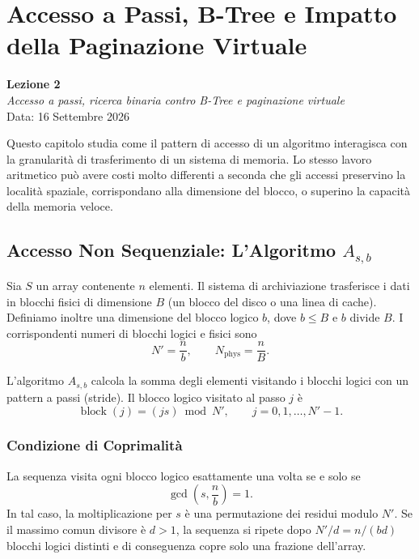 \chapter{Accesso a Passi, B-Tree e Impatto della Paginazione Virtuale}
\label{cha:lecture-two}

\begin{center}
  \textbf{Lezione 2}\\
  \emph{Accesso a passi, ricerca binaria contro B-Tree e paginazione virtuale}\\[0.5em]
  Data: 16 Settembre 2026
\end{center}

Questo capitolo studia come il pattern di accesso di un algoritmo interagisca con la granularità di trasferimento di un sistema di memoria. Lo stesso lavoro aritmetico può avere costi molto differenti a seconda che gli accessi preservino la località spaziale, corrispondano alla dimensione del blocco, o superino la capacità della memoria veloce.

\section{Accesso Non Sequenziale: L'Algoritmo \texorpdfstring{$A_{s,b}$}{A-s-b}}
\label{sec:strided-access}

Sia $S$ un array contenente $n$ elementi. Il sistema di archiviazione trasferisce i dati in blocchi fisici di dimensione $B$ (un blocco del disco o una linea di cache). Definiamo inoltre una dimensione del blocco logico $b$, dove $b \leq B$ e $b$ divide $B$. I corrispondenti numeri di blocchi logici e fisici sono
\[
  N' = \frac{n}{b},
  \qquad
  N_{\mathrm{phys}} = \frac{n}{B}.
\]

L'algoritmo $A_{s,b}$ calcola la somma degli elementi visitando i blocchi logici con un pattern a passi (stride). Il blocco logico visitato al passo $j$ è
\[
  \operatorname{block}(j) = (j s) \bmod N',
  \qquad j = 0,1,\ldots,N'-1.
\]

\subsection{Condizione di Coprimalità}
\label{subsec:coprimality}

La sequenza visita ogni blocco logico esattamente una volta se e solo se
\[
  \gcd\!\left(s,\frac{n}{b}\right)=1.
\]
In tal caso, la moltiplicazione per $s$ è una permutazione dei residui modulo $N'$. Se il massimo comun divisore è $d>1$, la sequenza si ripete dopo $N'/d = n/(bd)$ blocchi logici distinti e di conseguenza copre solo una frazione dell'array.


